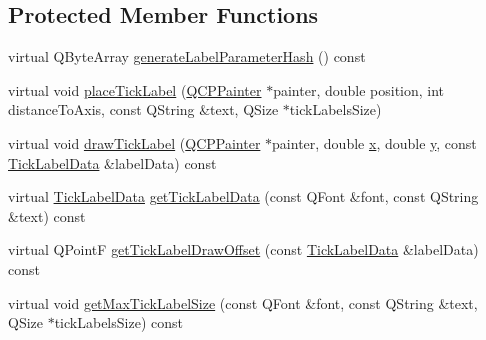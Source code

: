 \subsection*{Protected Member Functions}
\begin{DoxyCompactItemize}
\item 
virtual Q\+Byte\+Array \hyperlink{class_q_c_p_axis_painter_private_a91a023bbefe1c3bf330570c0b985de84}{generate\+Label\+Parameter\+Hash} () const 
\item 
virtual void \hyperlink{class_q_c_p_axis_painter_private_af8fe7350c19575bc33ca770f9b3a15fd}{place\+Tick\+Label} (\hyperlink{class_q_c_p_painter}{Q\+C\+P\+Painter} $\ast$painter, double position, int distance\+To\+Axis, const Q\+String \&text, Q\+Size $\ast$tick\+Labels\+Size)
\item 
virtual void \hyperlink{class_q_c_p_axis_painter_private_ad8f2f12cd35b8189e8bf96679e873933}{draw\+Tick\+Label} (\hyperlink{class_q_c_p_painter}{Q\+C\+P\+Painter} $\ast$painter, double \hyperlink{_v_s_a___u_t_2_comparision_pictures_2_createtest_image_8m_a9336ebf25087d91c818ee6e9ec29f8c1}{x}, double \hyperlink{_v_s_a___u_t_2_comparision_pictures_2_createtest_image_8m_a2fb1c5cf58867b5bbc9a1b145a86f3a0}{y}, const \hyperlink{struct_q_c_p_axis_painter_private_1_1_tick_label_data}{Tick\+Label\+Data} \&label\+Data) const 
\item 
virtual \hyperlink{struct_q_c_p_axis_painter_private_1_1_tick_label_data}{Tick\+Label\+Data} \hyperlink{class_q_c_p_axis_painter_private_ad9f24fbcbf9d8c92b34d9d00b010e6a3}{get\+Tick\+Label\+Data} (const Q\+Font \&font, const Q\+String \&text) const 
\item 
virtual Q\+Point\+F \hyperlink{class_q_c_p_axis_painter_private_a6b02e6fd70cc65f726ca8cb3e6f16de4}{get\+Tick\+Label\+Draw\+Offset} (const \hyperlink{struct_q_c_p_axis_painter_private_1_1_tick_label_data}{Tick\+Label\+Data} \&label\+Data) const 
\item 
virtual void \hyperlink{class_q_c_p_axis_painter_private_a8a7c82303e272485621fde78a5b674f9}{get\+Max\+Tick\+Label\+Size} (const Q\+Font \&font, const Q\+String \&text, Q\+Size $\ast$tick\+Labels\+Size) const 
\end{DoxyCompactItemize}
